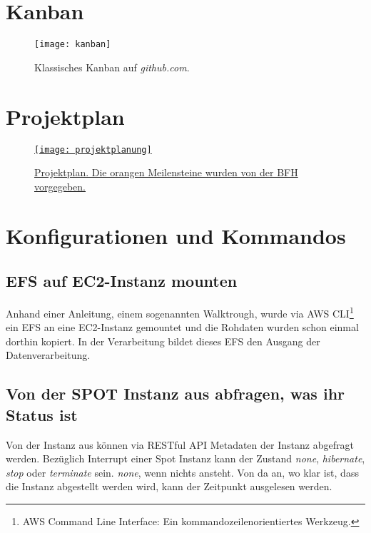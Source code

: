 \section{Kanban}\label{appendix:kanban}
\begin{figure}[H]
	\centering
	\texttt{[image: kanban]}
	\caption{Klassisches Kanban auf \emph{github.com}.}
	\label{fig:Klassisches Kanban}
\end{figure}

\section{Projektplan}\label{appendix:projektplan}
\begin{figure}[H]
	\centering
	\href{https://docs.google.com/spreadsheets/d/1zKTZgt4BW736G0xRfU9o3vWYwAJj-8nzFvGsPR7yJ_0/edit?usp=sharing}{
	\texttt{[image: projektplanung]}}
	\caption{\href{https://docs.google.com/spreadsheets/d/1zKTZgt4BW736G0xRfU9o3vWYwAJj-8nzFvGsPR7yJ_0/edit?usp=sharing}{Projektplan. Die orangen Meilensteine wurden von der BFH vorgegeben.}}
	\label{fig:Projektplan}
\end{figure}

\section{Konfigurationen und Kommandos}
\subsection{EFS auf EC2-Instanz mounten}
Anhand einer Anleitung, einem sogenannten Walktrough, wurde via AWS CLI\footnote{AWS Command Line Interface: Ein kommandozeilenorientiertes Werkzeug.} ein
EFS an eine EC2-Instanz gemountet und die Rohdaten wurden schon einmal dorthin kopiert. In der Verarbeitung bildet dieses EFS den Ausgang der Datenverarbeitung.


\subsection{Von der SPOT Instanz aus abfragen, was ihr Status ist}\label{appendix:restful}
Von der Instanz aus können via RESTful API Metadaten der Instanz abgefragt werden. Bezüglich Interrupt einer Spot Instanz kann der Zustand \emph{none}, \emph{hibernate}, \emph{stop} oder \emph{terminate} sein. \emph{none}, wenn nichts ansteht. Von da an, wo klar ist, dass die Instanz abgestellt werden wird, kann der Zeitpunkt ausgelesen werden.


